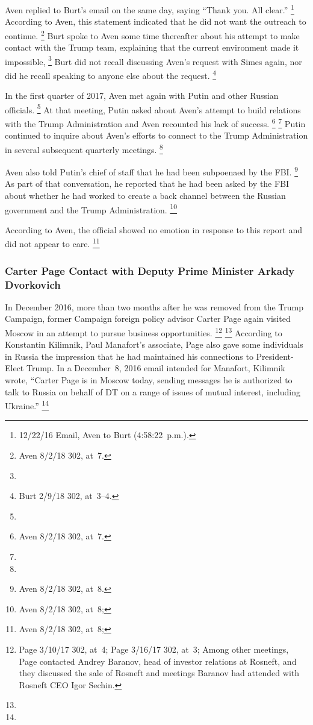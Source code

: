 Aven replied to Burt's email on the same day, saying ``Thank you. All clear.''%
\footnote{12/22/16 Email, Aven to Burt (4:58:22~p.m.).}
According to Aven, this statement indicated that he did not want the outreach to continue.%
\footnote{Aven 8/2/18 302, at~7.}
Burt spoke to Aven some time thereafter about his attempt to make contact with the Trump team, explaining that the current environment made it impossible,
\footnote{}
Burt did not recall discussing Aven's request with Simes again, nor did he recall speaking to anyone else about the request.%
\footnote{Burt 2/9/18 302, at~3--4.}

In the first quarter of 2017, Aven met again with Putin and other Russian officials.%
\footnote{}
At that meeting, Putin asked about Aven's attempt to build relations with the Trump Administration and Aven recounted his lack of success.%
\footnote{ Aven 8/2/18 302, at~7.}
\footnote{}
Putin continued to inquire about Aven's efforts to connect to the Trump Administration in several subsequent quarterly meetings.%
\footnote{}

Aven also told Putin's chief of staff that he had been subpoenaed by the FBI\null.%
\footnote{Aven 8/2/18 302, at~8.}
As part of that conversation, he reported that he had been asked by the FBI about whether he had worked to create a back channel between the Russian government and the Trump Administration.%
\footnote{Aven 8/2/18 302, at~8; }

According to Aven, the official showed no emotion in response to this report and did not appear to care.%
\footnote{Aven 8/2/18 302, at~8; }

\subsubsection{Carter Page Contact with Deputy Prime Minister Arkady Dvorkovich}

In December 2016, more than two months after he was removed from the Trump Campaign, former Campaign foreign policy advisor Carter Page again visited Moscow in an attempt to pursue business opportunities.%
\footnote{Page 3/10/17 302, at~4;
Page 3/16/17 302, at~3;
 Among other meetings, Page contacted Andrey Baranov, head of investor relations at Rosneft, and they discussed the sale of Rosneft and meetings Baranov had attended with Rosneft CEO Igor Sechin.
}
\footnote{}
According to Konstantin Kilimnik, Paul Manafort's associate, Page also gave some individuals in Russia the impression that he had maintained his connections to President-Elect Trump.
In a December~8, 2016 email intended for Manafort, Kilimnik wrote, ``Carter Page is in Moscow today, sending messages he is authorized to talk to Russia on behalf of DT on a range of issues of mutual interest, including Ukraine.''%
\footnote{}

